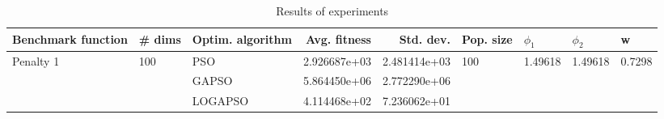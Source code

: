 \begin{table}
\centering
\caption{Results of experiments}
\begin{tabular}{lllrrllll}
\toprule
        Benchmark function &              \# dims & Optim. algorithm &  Avg. fitness &    Std. dev. &            Pop. size &               $\phi_{1}$ &               $\phi_{2}$ &                       w \\
\midrule
\multirow{3}{*}{Penalty 1} & \multirow{3}{*}{100} &              PSO &  2.926687e+03 & 2.481414e+03 & \multirow{3}{*}{100} & \multirow{3}{*}{1.49618} & \multirow{3}{*}{1.49618} & \multirow{3}{*}{0.7298} \\
                           &                      &            GAPSO &  5.864450e+06 & 2.772290e+06 &                      &                          &                          &                         \\
                           &                      &          LOGAPSO &  4.114468e+02 & 7.236062e+01 &                      &                          &                          &                         \\
\bottomrule
\end{tabular}
\end{table}
